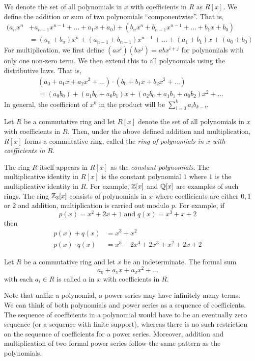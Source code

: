 We denote the set of all polynomials in $x$ with coefficients in $R$ as $R[x]$. We define the addition or sum of two polynomials ``componentwise''. That is,
\begin{align*}
    (a_nx^n &+ a_{n-1}x^{n-1} + \ldots + a_1x + a_0) + (b_nx^n + b_{n-1}x^{n-1} + \ldots + b_1x + b_0) \\
    &= (a_n+b_n)x^n + (a_{n-1}+b_{n-1})x^{n-1} + \ldots + (a_1+b_1)x + (a_0 + b_0)
\end{align*}  
For multiplication, we first define $(ax^i)(bx^j) = abx^{i+j}$ for polynomials with only one non-zero term. We then extend this to all polynomials using the distributive laws. That is,
\begin{align*}
    &(a_0 + a_1x + a_2x^2 + \ldots) \cdot (b_0 + b_1x + b_2x^2 + \ldots) \\
    &= (a_0b_0) + (a_1b_0 + a_0b_1)x + (a_2b_0 + a_1b_1 + a_0b_2)x^2 + \ldots
\end{align*}
In general, the coefficient of $x^k$ in the product will be $\sum_{i=0}^k a_ib_{k-i}$.
\begin{prop} \label{prop:ring-of-polynomials}
    Let $R$ be a commutative ring and let $R[x]$ denote the set of all polynomials in $x$ with coefficients in $R$. Then, under the above defined addition and multiplication, $R[x]$ forms a commutative ring, called the \emph{ring of polynomials in $x$ with coefficients in $R$}.
\end{prop}
The ring $R$ itself appears in $R[x]$ as the \emph{constant polynomials}. The multiplicative identity in $R[x]$ is the constant polynomial $1$ where $1$ is the multiplicative identity in $R$. For example, $\mathbb{Z}[x]$ and $\mathbb{Q}[x]$ are examples of such rings. The ring $\mathbb{Z}_3[x]$ consists of polynomials in $x$ where coefficients are either $0,1$ or $2$ and addition, multiplication is carried out modulo $p$. For example, if
\[
    p(x) = x^2 + 2x + 1 \text{ and } q(x) = x^3 + x + 2
\]
then
\begin{align*}
    p(x) + q(x) &= x^3 + x^2 \\
    p(x) \cdot q(x) &= x^5 + 2x^4 + 2x^3 + x^2 + 2x + 2
\end{align*}

\begin{defn}
    Let $R$ be a commutative ring and let $x$ be an indeterminate. The formal sum
    \[
        a_0 + a_1x + a_2x^2 + \ldots
    \]  
    with each $a_i \in R$ is called a  in $x$ with coefficients in $R$.
\end{defn}
Note that unlike a polynomial, a power series may have infinitely many terms. We can think of both polynomials and power series as a sequence of coefficients. The sequence of coefficients in a polynomial would have to be an eventually zero sequence (or a sequence with finite support), whereas there is no such restriction on the sequence of coefficients for a power series. Moreover, addition and multiplication of two formal power series follow the same pattern as the polynomials.

